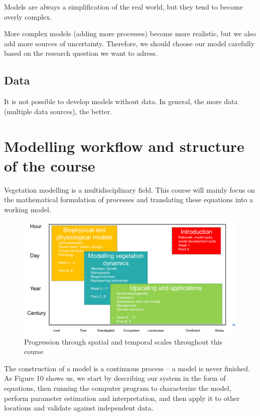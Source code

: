 \documentclass[12pt,oneside]{book}
\begin{document}
Models are always a simplification of the real world, but they tend to
become overly complex.

More complex models (adding more processes) become more realistic, but
we also add more sources of uncertainty. Therefore, we should choose our
model carefully based on the research question we want to adress.

\subsection{Data}\label{data}

It is not possible to develop models without data. In general, the more
data (multiple data sources), the better.

\section{Modelling workflow and structure of the
course}\label{modelling-workflow-and-structure-of-the-course}

Vegetation modelling is a multidisciplinary field. This course will
mainly focus on the mathematical formulation of processes and
translating these equations into a working model.

\begin{figure}

{\centering \includegraphics[width=0.9\linewidth]{figures/chap1/course_overview} 

}

\caption{Progression through spatial and temporal scales throughout this course}\label{fig:f12}
\end{figure}

The construction of a model is a continuous process -- a model is never
finished. As Figure 10 shows us, we start by describing our system in
the form of equations, then running the computer program to characterize
the model, perform parameter estimation and interpretation, and then
apply it to other locations and validate against independent data.
\end{document}

